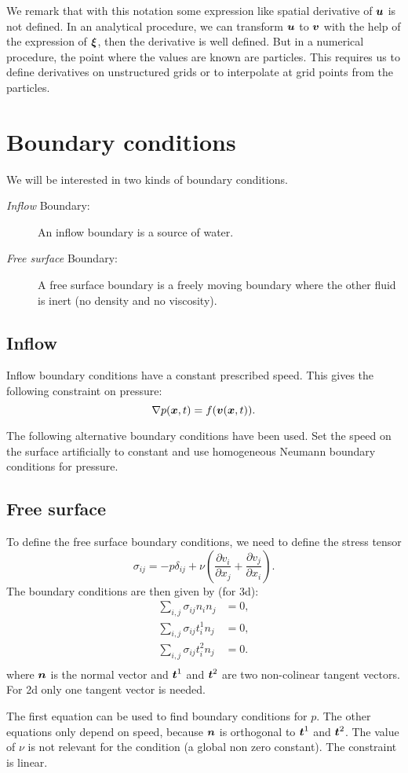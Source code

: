 \begin{remark}
We remark that with this notation some expression like spatial derivative of ${\boldsymbol {u}}$ is not defined.
In an analytical procedure, we can transform ${\boldsymbol {u}}$ to ${\boldsymbol {v}}$ with the help of the expression of ${\boldsymbol {\xi}}$, then the derivative is well defined.
But in a numerical procedure, the point where the values are known are particles. This requires us to define derivatives on unstructured grids
or to interpolate at grid points from the particles.
\end{remark}

\section{Boundary conditions}

We will be interested in two kinds of boundary conditions.
\begin{description}
 \item[\emph{Inflow} Boundary:]
 An inflow boundary is a source of water.
 \item[\emph{Free surface} Boundary:]
 A free surface boundary is a freely moving boundary where the other fluid is inert (no density and no viscosity).
\end{description}

\subsection{Inflow}

Inflow boundary conditions have a constant prescribed speed.
This gives the following constraint on pressure:
\begin{equation}
\nabla p({\boldsymbol {x}},t)=f({\boldsymbol {v}}({\boldsymbol {x}},t)).
\end{equation}

The following alternative boundary conditions have been used.
Set the speed on the surface artificially to constant and use homogeneous Neumann boundary conditions for pressure.


\subsection{Free surface}
\label{ana:free:surface}
To define the free surface boundary conditions, we need to define the stress tensor
\begin{equation}
	\sigma_{ij}=-p \delta_{ij}+\nu\left(\frac{\partial v_{i}}{\partial x_{j}}+\frac{\partial v_{j}}{\partial x_{i}}\right).
\end{equation}
The boundary conditions are then given by (for 3d):
\begin{align}
	\sum_{i,j}\sigma_{ij}n_{i}n_{j}&=0,\\
	\sum_{i,j}\sigma_{ij}t^{1}_{i}n_{j}&=0,\\
	\sum_{i,j}\sigma_{ij}t^{2}_{i}n_{j}&=0.\\
\end{align}
where ${\boldsymbol {n}}$ is the normal vector and ${\boldsymbol {t}}^1$ and ${\boldsymbol {t}}^2$ are two non-colinear tangent vectors.
For 2d only one tangent vector is needed.

The first equation can be used to find boundary conditions for $p$.
The other equations only depend on speed, because ${\boldsymbol {n}}$ is orthogonal to ${\boldsymbol {t}}^{1}$ and ${\boldsymbol {t}}^{2}$.
The value of $\nu$ is not relevant for the condition (a global non zero constant).
The constraint is linear.
